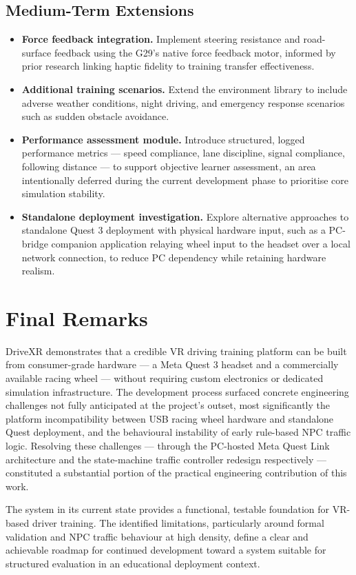 \subsection{Medium-Term Extensions}
\begin{itemize}
    \item \textbf{Force feedback integration.} Implement steering resistance and road-surface feedback using the G29's native force feedback motor, informed by prior research linking haptic fidelity to training transfer effectiveness.
    
    \item \textbf{Additional training scenarios.} Extend the environment library to include adverse weather conditions, night driving, and emergency response scenarios such as sudden obstacle avoidance.
    
    \item \textbf{Performance assessment module.} Introduce structured, logged performance metrics — speed compliance, lane discipline, signal compliance, following distance — to support objective learner assessment, an area intentionally deferred during the current development phase to prioritise core simulation stability.
    
    \item \textbf{Standalone deployment investigation.} Explore alternative approaches to standalone Quest 3 deployment with physical hardware input, such as a PC-bridge companion application relaying wheel input to the headset over a local network connection, to reduce PC dependency while retaining hardware realism.
\end{itemize}

\section{Final Remarks}
DriveXR demonstrates that a credible VR driving training platform can be built from consumer-grade hardware — a Meta Quest 3 headset and a commercially available racing wheel — without requiring custom electronics or dedicated simulation infrastructure. The development process surfaced concrete engineering challenges not fully anticipated at the project's outset, most significantly the platform incompatibility between USB racing wheel hardware and standalone Quest deployment, and the behavioural instability of early rule-based NPC traffic logic. Resolving these challenges — through the PC-hosted Meta Quest Link architecture and the state-machine traffic controller redesign respectively — constituted a substantial portion of the practical engineering contribution of this work.

The system in its current state provides a functional, testable foundation for VR-based driver training. The identified limitations, particularly around formal validation and NPC traffic behaviour at high density, define a clear and achievable roadmap for continued development toward a system suitable for structured evaluation in an educational deployment context.